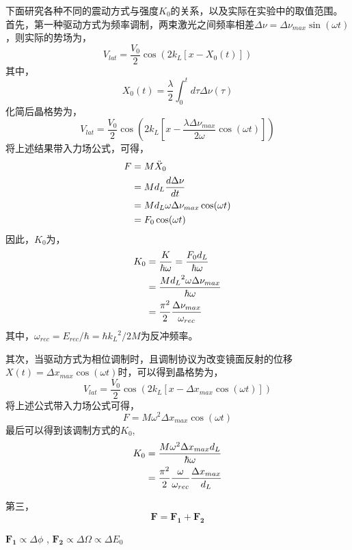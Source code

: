 \documentclass{article}
\begin{document}
	

	下面研究各种不同的震动方式与强度$K_0$的关系，以及实际在实验中的取值范围。
	首先，第一种驱动方式为频率调制，两束激光之间频率相差$\Delta \nu = \Delta \nu_{max} \sin(\omega t)$，则实际的势场为，
	\begin{equation}
		V_{lat} = \frac{V_0}{2} \cos(2k_L \left[ x - X_0(t) \right])
	\end{equation}
	其中，
	\begin{equation}
		X_0(t) = \frac{\lambda}{2} \int_0^t d \tau \Delta \nu(\tau)
	\end{equation}
	化简后晶格势为，
	\begin{equation}
		V_{lat} = \frac{V_0}{2} \cos \left( 2k_L \left[ x - \frac{\lambda \Delta \nu_{max}}{2\omega} \cos(\omega t) \right] \right)
	\end{equation}
	将上述结果带入力场公式，可得，
	\begin{align}
		F &= M \ddot{X}_0  \notag \\
		  &= M d_L\frac{d \Delta \nu}{dt} \notag \\
		  &= M d_L \omega \Delta \nu_{max} \cos(\omega t) \notag \\
		  &= F_0 \cos(\omega t)
	\end{align}
	因此，$K_0$为，
	\begin{align}
		K_0 &= \frac{K}{\hbar \omega}=\frac{F_0d_L}{\hbar \omega} \notag \\
			&= \frac{M {d_L}^2 \omega \Delta \nu_{max}}{\hbar \omega} \notag \\
			&= \frac{\pi^2}{2} \frac{\Delta \nu_{max}}{\omega_{rec}}
	\end{align}
	其中，$\omega_{rec} = E_{rec}/\hbar = \hbar {k_L}^2 / 2M$为反冲频率。
	
	其次，当驱动方式为相位调制时，且调制协议为改变镜面反射的位移$X(t) = \Delta x_{max} \cos(\omega t)$时，可以得到晶格势为，
	\begin{equation}
		V_{lat} = \frac{V_0}{2} \cos(2k_L \left[ x - \Delta x_{max} \cos(\omega t) \right])
	\end{equation}
	将上述公式带入力场公式可得，
	\begin{equation}
		F = M \omega^2 \Delta x_{max} \cos(\omega t)
	\end{equation}
	最后可以得到该调制方式的$K_0$,
	\begin{align}
		K_0 &= \frac{ M \omega^2 \Delta x_{max} d_L}{\hbar \omega} \notag \\
			&= \frac{\pi^2}{2} \frac{\omega}{\omega_{rec}} \frac{\Delta x_{max}}{d_L}
	\end{align}
	 
	第三，
	\begin{equation}
		\boldsymbol{F = F_1 + F_2}
	\end{equation}
	
	$\boldsymbol{F_1} \propto \Delta \phi$ , $\boldsymbol{F_2} \propto \Delta \Omega \propto \Delta E_0$
	
	
\end{document}
